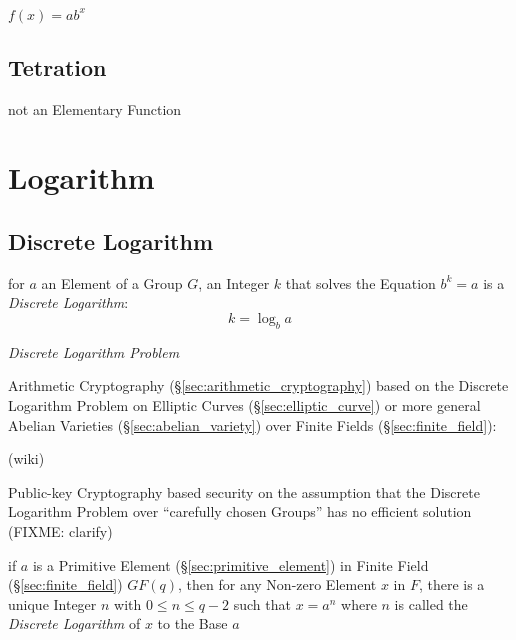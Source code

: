 $f(x) = ab^x$



\subsection{Tetration}\label{sec:tetration}

not an Elementary Function



\section{Logarithm}\label{sec:logarithm}

\subsection{Discrete Logarithm}\label{sec:discrete_logarithm}

for $a$ an Element of a Group $G$, an Integer $k$ that solves the Equation $b^k
= a$ is a \emph{Discrete Logarithm}:
\[
  k = \log_b a
\]

\emph{Discrete Logarithm Problem}

\fist Arithmetic Cryptography (\S\ref{sec:arithmetic_cryptography}) based on
the Discrete Logarithm Problem on Elliptic Curves (\S\ref{sec:elliptic_curve})
or more general Abelian Varieties (\S\ref{sec:abelian_variety}) over Finite
Fields (\S\ref{sec:finite_field}):

(wiki)

Public-key Cryptography based security on the assumption that the Discrete
Logarithm Problem over ``carefully chosen Groups'' has no efficient solution
(FIXME: clarify)

if $a$ is a Primitive Element (\S\ref{sec:primitive_element}) in Finite Field
(\S\ref{sec:finite_field}) $GF(q)$, then for any Non-zero Element $x$ in $F$,
there is a unique Integer $n$ with $0 \leq n \leq q - 2$ such that $x = a^n$
where $n$ is called the \emph{Discrete Logarithm} of $x$ to the Base $a$

